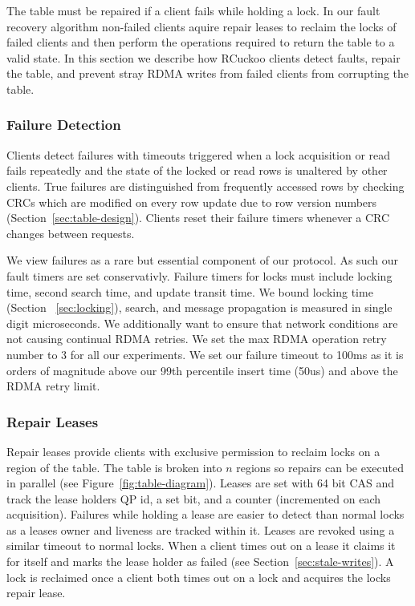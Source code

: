 The table must be repaired if a client fails while holding a
lock. In our fault recovery algorithm non-failed clients
aquire repair leases to reclaim the locks of failed clients
and then perform the operations required to return the table
to a valid state. In this section we describe how RCuckoo
clients detect faults, repair the table, and prevent stray
RDMA writes from failed clients from corrupting the table.

\subsubsection{Failure Detection} 

Clients detect failures with timeouts triggered when a lock
acquisition or read fails repeatedly and the state of the
locked or read rows is unaltered by other clients.  True
failures are distinguished from frequently accessed rows by
checking CRCs which are modified on every row update due to
row version numbers (Section~\ref{sec:table-design}).
Clients reset their failure timers whenever a CRC changes
between requests.


 We view failures
as a rare but essential component of our protocol. As such
our fault timers are set conservativly. Failure timers for
locks must include locking time, second search time, and
update transit time. We bound locking time (Section
~\ref{sec:locking}), search, and message propagation is
measured in single digit microseconds. We additionally want
to ensure that network conditions are not causing continual
RDMA retries. We set the max RDMA operation retry number to
3 for all our experiments. We set our failure timeout to
100ms as it is orders of magnitude above our 99th percentile
insert time (50us) and above the RDMA retry limit.


\subsubsection{Repair Leases}

Repair leases provide clients with exclusive permission to
reclaim locks on a region of the table. The table is broken
into $n$ regions so repairs can be executed in parallel (see
Figure~\ref{fig:table-diagram}). Leases are set with 64 bit
CAS and track the lease holders QP id, a set bit, and a
counter (incremented on each acquisition).  Failures while
holding a lease are easier to detect than normal locks as a
leases owner and liveness are tracked within it.  Leases are
revoked using a similar timeout to normal locks. When a
client times out on a lease it claims it for itself and
marks the lease holder as failed (see
Section~\ref{sec:stale-writes}).  A lock is reclaimed once a
client both times out on a lock and acquires the locks
repair lease. 


